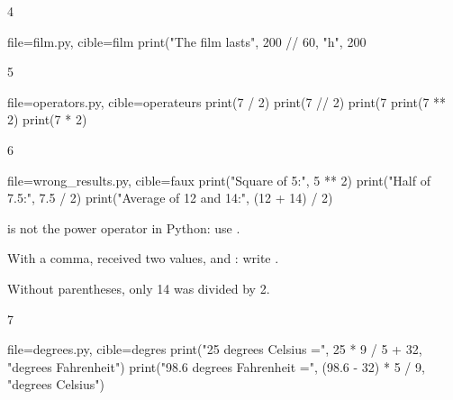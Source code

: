 \begin{corrige}{4}
\begin{code}{file=film.py, cible=film}
print("The film lasts", 200 // 60, "h", 200 %
\end{code}
\end{corrige}

\begin{corrige}{5}
\begin{code}{file=operators.py, cible=operateurs}
print(7 / 2)
print(7 // 2)
print(7 %
print(7 ** 2)
print(7 * 2)
\end{code}
\end{corrige}

\begin{corrige}{6}
\begin{code}{file=wrong_results.py, cible=faux}
print("Square of 5:", 5 ** 2)
print("Half of 7.5:", 7.5 / 2)
print("Average of 12 and 14:", (12 + 14) / 2)
\end{code}
\begin{reponses}
\item \py{\textasciicircum} is not the power operator in Python: use \py{**}.
\item With a comma,  received two values,  and : write .
\item Without parentheses, only 14 was divided by 2.
\end{reponses}
\end{corrige}

\begin{corrige}{7}
\begin{code}{file=degrees.py, cible=degres}
print("25 degrees Celsius =", 25 * 9 / 5 + 32, "degrees Fahrenheit")
print("98.6 degrees Fahrenheit =", (98.6 - 32) * 5 / 9,
      "degrees Celsius")
\end{code}
\end{corrige}

